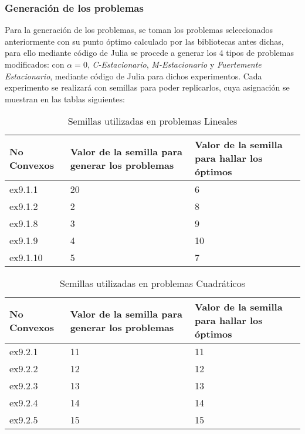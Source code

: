 \subsubsection{Generación de los problemas}
Para la generación de los problemas, se toman los problemas seleccionados anteriormente con su punto óptimo calculado por las bibliotecas antes dichas, para ello mediante código de Julia se procede a generar los 4 tipos de problemas modificados: con \textit{$\alpha =0 $}, \textit{C-Estacionario}, \textit{M-Estacionario} y \textit{Fuertemente Estacionario}, mediante 
código de Julia para dichos experimentos. Cada experimento se realizará con semillas para poder replicarlos, cuya asignación se muestran en las tablas siguientes:



\begin{table}[h!]
\centering
\caption{Semillas utilizadas en problemas Lineales}
\begin{tabular}{ | m{5cm} | m{5cm} | m{5cm} | }
  
  \hline
  \textbf{No Convexos} & \textbf{Valor de la semilla para generar los problemas}  & \textbf{Valor de la semilla para hallar los óptimos} \\
  \hline
 ex9.1.1 & 20 & 6 \\
  \hline
 ex9.1.2 & 2 & 8\\
  \hline
   ex9.1.8 & 3& 9 \\
  \hline
  ex9.1.9 & 4 & 10\\
  \hline
 ex9.1.10 & 5 & 7 \\
  \hline
\end{tabular}
\end{table}


\begin{table}[h!]
    \centering
    \caption{Semillas utilizadas en problemas Cuadráticos}
    \begin{tabular}{ | m{5cm} | m{5cm} | m{5cm} | }
      
      \hline
      \textbf{No Convexos} & \textbf{Valor de la semilla para generar los problemas}  & \textbf{Valor de la semilla para hallar los óptimos} \\
      \hline
      ex9.2.1 & 11 &11 \\
      \hline
      ex9.2.2 & 12 &12 \\
      \hline
      ex9.2.3 & 13 &13\\
      \hline
      ex9.2.4 & 14 &14\\
      \hline
      ex9.2.5 & 15 &15\\
      \hline
    \end{tabular}
    \end{table}

